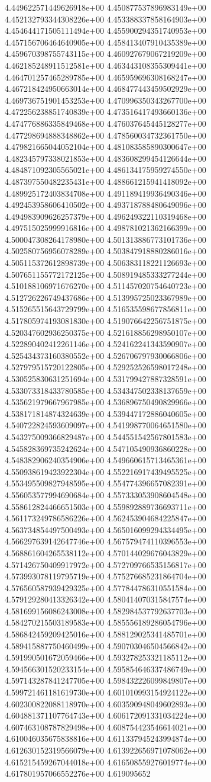 4.449622571449626918e+00	4.450877537896983149e+00	4.452132793344308226e+00	4.453388337858164903e+00	4.454644171505111494e+00	4.455900294351740953e+00	4.457156706464640905e+00	4.458413407910435389e+00	4.459670398755743115e+00	4.460927679067219209e+00	4.462185248911512581e+00	4.463443108355309441e+00	4.464701257465289785e+00	4.465959696308168247e+00	4.467218424950663014e+00	4.468477443459502929e+00	4.469736751901453253e+00	4.470996350343267700e+00	4.472256238851740839e+00	4.473516417493660136e+00	4.474776886335849468e+00	4.476037645445128277e+00	4.477298694888348862e+00	4.478560034732361750e+00	4.479821665044052104e+00	4.481083585890300647e+00	4.482345797338021853e+00	4.483608299454126644e+00	4.484871092305565021e+00	4.486134175959274550e+00	4.487397550482235431e+00	4.488661215941418092e+00	4.489925172403834708e+00	4.491189419936490346e+00	4.492453958606410502e+00	4.493718788480649096e+00	4.494983909626257379e+00	4.496249322110319468e+00	4.497515025999916816e+00	4.498781021362166399e+00	4.500047308264178980e+00	4.501313886773101736e+00	4.502580756956078289e+00	4.503847918880286016e+00	4.505115372612898739e+00	4.506383118221126693e+00	4.507651155772172125e+00	4.508919485333277244e+00	4.510188106971676270e+00	4.511457020754640723e+00	4.512726226749437686e+00	4.513995725023367989e+00	4.515265515643729799e+00	4.516535598677856811e+00	4.517805974193081830e+00	4.519076642256751875e+00	4.520347602936250375e+00	4.521618856298950107e+00	4.522890402412261146e+00	4.524162241343590907e+00	4.525434373160380552e+00	4.526706797930066806e+00	4.527979515720122805e+00	4.529252526598017248e+00	4.530525830631251694e+00	4.531799427887328591e+00	4.533073318433780585e+00	4.534347502338137659e+00	4.535621979667967985e+00	4.536896750490829966e+00	4.538171814874324639e+00	4.539447172886040605e+00	4.540722824593609097e+00	4.541998770064651580e+00	4.543275009366829487e+00	4.544551542567801583e+00	4.545828369735242624e+00	4.547105490936860228e+00	4.548382906240354906e+00	4.549660615713465361e+00	4.550938619423922304e+00	4.552216917439495525e+00	4.553495509827948595e+00	4.554774396657082391e+00	4.556053577994690684e+00	4.557333053908604548e+00	4.558612824466651503e+00	4.559892889736693711e+00	4.561173249786586226e+00	4.562453904684225847e+00	4.563734854497500493e+00	4.565016099294334495e+00	4.566297639142647746e+00	4.567579474110396553e+00	4.568861604265538112e+00	4.570144029676043829e+00	4.571426750409917972e+00	4.572709766535156817e+00	4.573993078119795719e+00	4.575276685231864704e+00	4.576560587939429325e+00	4.577844786310551584e+00	4.579129280413326342e+00	4.580414070315847574e+00	4.581699156086243008e+00	4.582984537792637703e+00	4.584270215503189583e+00	4.585556189286054796e+00	4.586842459209425016e+00	4.588129025341485701e+00	4.589415887750460499e+00	4.590703046504566842e+00	4.591990501672059466e+00	4.593278253321185112e+00	4.594566301520233154e+00	4.595854646337486749e+00	4.597143287841247705e+00	4.598432226099849807e+00	4.599721461181619730e+00	4.601010993154924122e+00	4.602300822088118970e+00	4.603590948049602893e+00	4.604881371107764743e+00	4.606172091331034224e+00	4.607463108787829498e+00	4.608754423546614021e+00	4.610046035675838816e+00	4.611337945243994874e+00	4.612630152319566079e+00	4.613922656971078062e+00	4.615215459267044018e+00	4.616508559276019774e+00	4.617801957066552276e+00	4.619095652